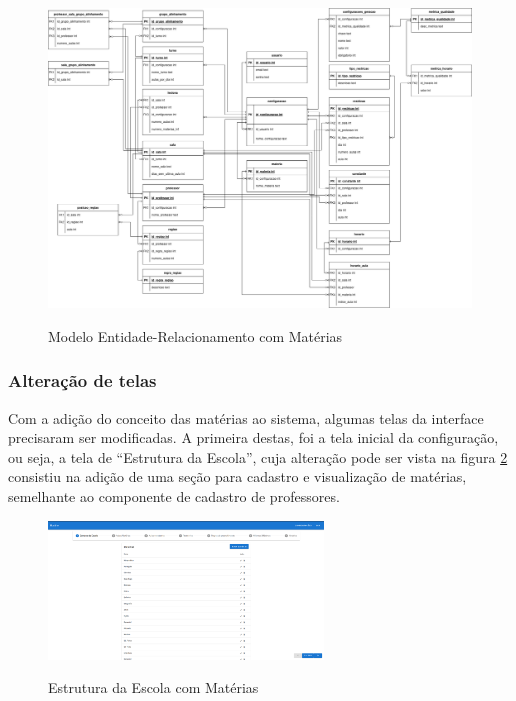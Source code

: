 \begin{figure}[h]
	\centering
	\caption{Modelo Entidade-Relacionamento com Matérias}
	\includegraphics[width=1\textwidth]{./dados/figuras/ER_horario_INCREMENTO6}
	\label{fig:modelagemMateiras}
\end{figure}

\subsubsection{Alteração de telas}
Com a adição do conceito das matérias ao sistema, algumas telas da interface precisaram ser modificadas. A primeira destas, foi a tela inicial da configuração, ou seja, a tela de ``Estrutura da Escola'', cuja alteração pode ser vista na figura \ref{fig:estruturaAtualizada} consistiu na adição de uma seção para cadastro e visualização de matérias, semelhante ao componente de cadastro de professores.

\begin{figure}[h]
	\centering
	\caption{Estrutura da Escola com Matérias}
	\includegraphics[width=0.65\textwidth]{./dados/figuras/alteracaoEstrutura}
	\label{fig:estruturaAtualizada}
\end{figure}
\pagebreak

